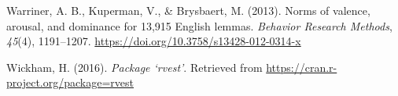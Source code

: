 \documentclass[
  man,floatsintext]{apa6}
\newlength{\cslhangindent}
\newlength{\cslentryspacingunit} %
\newenvironment{CSLReferences}[2] %
 {%
  \setlength{\parindent}{0pt}
  \ifodd #1
  \let\oldpar\par
  \def\par{\hangindent=\cslhangindent\oldpar}
  \fi
  \setlength{\parskip}{#2\cslentryspacingunit}
 }%
 {}
\begin{document}
\begin{CSLReferences}{1}{0}
\leavevmode{}%
Warriner, A. B., Kuperman, V., \& Brysbaert, M. (2013). {Norms of valence, arousal, and dominance for 13,915 English lemmas}. \emph{Behavior Research Methods}, \emph{45}(4), 1191--1207. \url{https://doi.org/10.3758/s13428-012-0314-x}

\leavevmode{}%
Wickham, H. (2016). \emph{{Package `rvest'}}. Retrieved from \url{https://cran.r-project.org/package=rvest}

\end{CSLReferences}

\endgroup
\end{document}
